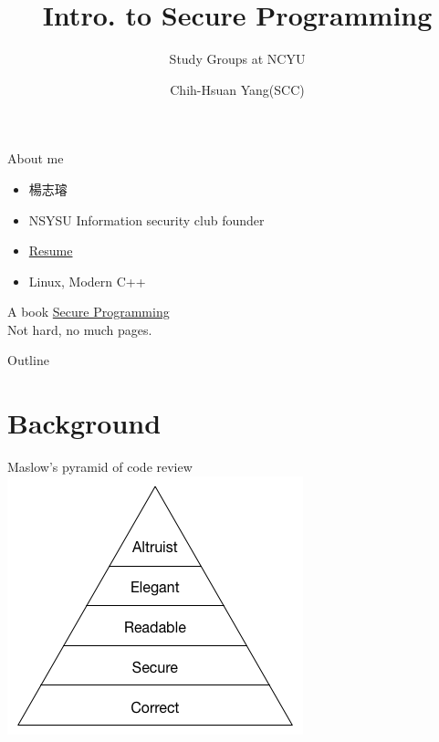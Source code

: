 \documentclass{beamer}
\begin{document}
\begin{CJK*}{UTF8}{bsmi}

    \title{Intro. to Secure Programming}
    \subtitle{Study Groups at NCYU}
    \author{Chih-Hsuan Yang(SCC)}

    \begin{frame}
        \titlepage
    \end{frame}

    \begin{frame}{About me}
        \begin{itemize}
            \item 楊志璿
            \item NSYSU Information security club founder
            \item \href{https://github.com/25077667/Resume/blob/main/resume/resume.pdf}{Resume}
            \item Linux, Modern C++
        \end{itemize}
    \end{frame}

    \begin{frame}{A book}
        \href{https://dwheeler.com/secure-programs/}{Secure Programming}\\
        Not hard, no much pages.
    \end{frame}

    \begin{frame}{Outline}
        \tableofcontents
    \end{frame}

    \section{Background}
    \begin{frame}{Maslow’s pyramid of code review}
        \centering\includegraphics[height=.9\textheight]{Maslow.png}
    \end{frame}


\end{CJK*}
\end{document}
